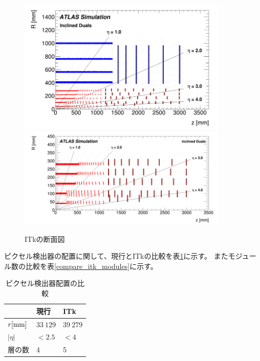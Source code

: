 \begin{figure}[bpt]\centering
\includegraphics[width=10cm]{itk_cross_section}
\includegraphics[width=10cm]{itk_pixel_cross_section}
\caption[ITkの断面図]{ITkの断面図\cite{1-3}}
\label{itk_cross_section}
\end{figure}

ピクセル検出器の配置に関して、現行とITkの比較を表\ref{compare_itk_pixel}に示す。
またモジュール数の比較を表\ref{compare_itk_modules}に示す。

\begin{table}[tbp]
\begin{center}
\caption[ピクセル検出器配置の比較]{ピクセル検出器配置の比較}
\label{compare_itk_pixel}
  \begin{tabular}{|lll|} \hline
    & 現行 & ITk \\ \hline
    $r[\rm{mm}]$ & $33~129$ & $39~279$ \\ 
    $|\eta|$ & $<2.5$ & $<4$ \\ 
    層の数 & 4 & 5 \\ \hline
  \end{tabular}
\end{center}
\end{table}

